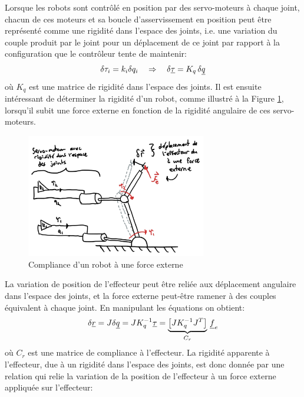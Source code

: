 Lorsque les robots sont contrôlé en position par des servo-moteurs à chaque joint, chacun de ces moteurs et sa boucle d'asservissement en position peut être représenté comme une rigidité dans l'espace des joints, i.e. une variation du couple produit par le joint pour un déplacement de ce joint par rapport à la configuration que le contrôleur tente de maintenir:
\begin{align}
\delta \tau_i = k_i \delta q_i \quad \Rightarrow \quad \delta \underline{\tau} = K_q \, \delta \underline{q}
\end{align}
où $K_q$ est une matrice de rigidité dans l'espace des joints. Il est ensuite intéressant de déterminer la rigidité d'un robot, comme illustré à la Figure \ref{fig:robotcompliance}, lorsqu'il subit une force externe en fonction de la rigidité angulaire de ces servo-moteurs.
\begin{figure}[htbp]
	\centering
		\includegraphics[width=0.70\textwidth]{fig/robotcompliance.jpg}
	\caption{Compliance d'un robot à une force externe}
	\label{fig:robotcompliance}
\end{figure}
La variation de position de l'effecteur peut être reliée aux déplacement angulaire dans l'espace des joints, et la force externe peut-être ramener à des couples équivalent à chaque joint. En manipulant les équations on obtient:
\begin{align}
\delta \underline{r} = J \delta \underline{q} = J K_q^{-1} \underline{\tau} = 
\underbrace{
\left[ J K_q^{-1} J^T \right]
}_{C_r} \,  \underline{f}_e
\end{align}
où $C_r$ est une matrice de compliance à l'effecteur. La rigidité apparente à l'effecteur, due à un rigidité dans l'espace des joints, est donc donnée par une relation qui relie la variation de la position de l'effecteur à un force externe appliquée sur l'effecteur:
